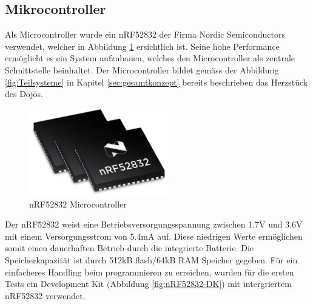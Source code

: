 \subsection{Mikrocontroller} \label{sec:microcontrollerHardware}

Als Microcontroller wurde ein nRF52832 der Firma Nordic Semiconductors verwendet, welcher in Abbildung \ref{fig:nRF52832} ersichtlich ist. Seine hohe Performance ermöglicht es ein System aufzubauen, welches den Microcontroller als zentrale Schnittstelle beinhaltet. Der Microcontroller bildet gemäss der Abbildung \ref{fig:Teilsysteme} in Kapitel \ref{sec:gesamtkonzept} bereits beschrieben das Herzstück des Dōjōs. 

\begin{figure}[H]
	\begin{center}
		\includegraphics[width=60mm]{data/nRF52832.png}
		\caption[nRF52832 Microcontroller]{nRF52832 Microcontroller \cite{nRF52832}} %
		\label{fig:nRF52832}
	\end{center}
\end{figure}

Der nRF52832 weist eine Betriebsversorgungsspannung zwischen 1.7V und 3.6V mit einem Versorgungsstrom von 5.4mA auf. Diese niedrigen Werte ermöglichen somit einen dauerhaften Betrieb durch die integrierte Batterie. Die Speicherkapazität ist durch 512kB flash/64kB RAM Speicher gegeben. Für ein einfacheres Handling beim programmieren zu erreichen, wurden für die ersten Tests ein Development Kit (Abbildung \ref{fig:nRF52832-DK}) mit intergriertem nRF52832 verwendet.

